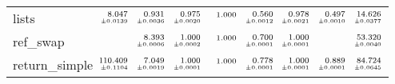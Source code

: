 \documentclass[a4paper,UKenglish]{lipics-v2016}
\begin{document}
\begin{table*}[t]
\begin{adjustbox}{width=1.2\textwidth,center}
\begin{tabular}{lrrrrrrrr}
lists&$\substack{\mathmakebox[.7cm][r]{8.047}\\{\mathmakebox[.7cm][r]{\scriptscriptstyle \pm 0.0139}}}$&$\substack{\mathmakebox[.7cm][r]{0.931}\\{\mathmakebox[.7cm][r]{\scriptscriptstyle \pm 0.0036}}}$&$\substack{\mathmakebox[.7cm][r]{0.975}\\{\mathmakebox[.7cm][r]{\scriptscriptstyle \pm 0.0020}}}$&$\substack{\mathmakebox[.7cm][r]{1.000}\\{\mathmakebox[.7cm][r]{\scriptscriptstyle }}}$&$\substack{\mathmakebox[.7cm][r]{0.560}\\{\mathmakebox[.7cm][r]{\scriptscriptstyle \pm 0.0012}}}$&$\substack{\mathmakebox[.7cm][r]{0.978}\\{\mathmakebox[.7cm][r]{\scriptscriptstyle \pm 0.0021}}}$&$\substack{\mathmakebox[.7cm][r]{0.497}\\{\mathmakebox[.7cm][r]{\scriptscriptstyle \pm 0.0010}}}$&$\substack{\mathmakebox[.7cm][r]{14.626}\\{\mathmakebox[.7cm][r]{\scriptscriptstyle \pm 0.0377}}}$\\
\addlinespace
ref\_swap&&$\substack{\mathmakebox[.7cm][r]{8.393}\\{\mathmakebox[.7cm][r]{\scriptscriptstyle \pm 0.0006}}}$&$\substack{\mathmakebox[.7cm][r]{1.000}\\{\mathmakebox[.7cm][r]{\scriptscriptstyle \pm 0.0002}}}$&$\substack{\mathmakebox[.7cm][r]{1.000}\\{\mathmakebox[.7cm][r]{\scriptscriptstyle }}}$&$\substack{\mathmakebox[.7cm][r]{0.700}\\{\mathmakebox[.7cm][r]{\scriptscriptstyle \pm 0.0001}}}$&$\substack{\mathmakebox[.7cm][r]{1.000}\\{\mathmakebox[.7cm][r]{\scriptscriptstyle \pm 0.0001}}}$&&$\substack{\mathmakebox[.7cm][r]{53.320}\\{\mathmakebox[.7cm][r]{\scriptscriptstyle \pm 0.0040}}}$\\
\addlinespace
return\_simple&$\substack{\mathmakebox[.7cm][r]{110.409}\\{\mathmakebox[.7cm][r]{\scriptscriptstyle \pm 0.1104}}}$&$\substack{\mathmakebox[.7cm][r]{7.049}\\{\mathmakebox[.7cm][r]{\scriptscriptstyle \pm 0.0019}}}$&$\substack{\mathmakebox[.7cm][r]{1.000}\\{\mathmakebox[.7cm][r]{\scriptscriptstyle \pm 0.0001}}}$&$\substack{\mathmakebox[.7cm][r]{1.000}\\{\mathmakebox[.7cm][r]{\scriptscriptstyle }}}$&$\substack{\mathmakebox[.7cm][r]{0.778}\\{\mathmakebox[.7cm][r]{\scriptscriptstyle \pm 0.0001}}}$&$\substack{\mathmakebox[.7cm][r]{1.000}\\{\mathmakebox[.7cm][r]{\scriptscriptstyle \pm 0.0001}}}$&$\substack{\mathmakebox[.7cm][r]{0.889}\\{\mathmakebox[.7cm][r]{\scriptscriptstyle \pm 0.0001}}}$&$\substack{\mathmakebox[.7cm][r]{84.724}\\{\mathmakebox[.7cm][r]{\scriptscriptstyle \pm 0.0645}}}$\\

\end{tabular}
\end{adjustbox}
\end{table*}
\end{document}
